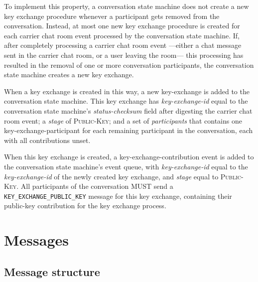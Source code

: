 \documentclass{article}
\def\message#1{\texttt{#1}}
\def\smfield#1{\textsl{#1}}
\def\type#1{\textsf{#1}}
\begin{document}
To implement this property, a conversation state machine does not create a new key exchange procedure whenever a participant gets removed from the conversation.
Instead, at most one new key exchange procedure is created for each carrier chat room event processed by the conversation state machine.
If, after completely processing a carrier chat room event ---either a chat message sent in the carrier chat room, or a user leaving the room--- this processing has resulted in the removal of one or more conversation participants, the conversation state machine creates a new key exchange.

When a key exchange is created in this way, a new \type{key-exchange} is added to the conversation state machine.
This key exchange has \smfield{key-exchange-id} equal to the conversation state machine's \smfield{status-checksum} field after digesting the carrier chat room event; a \smfield{stage} of \textsc{Public-Key}; and a set of \smfield{participants} that contains one \type{key-exchange-participant} for each remaining participant in the conversation, each with all contributions unset.

When this key exchange is created, a \type{key-exchange-contribution} event is added to the conversation state machine's event queue, with \smfield{key-exchange-id} equal to the \smfield{key-exchange-id} of the newly created key exchange, and \smfield{stage} equal to \textsc{Public-Key}.
All participants of the conversation MUST send a \message{KEY\_EXCHANGE\_PUBLIC\_KEY} message for this key exchange, containing their public-key contribution for the key exchange process.





\section{Messages}
\label{sec:messages}


\subsection{Message structure}
\label{sec:messages/message-structure}

\end{document}
